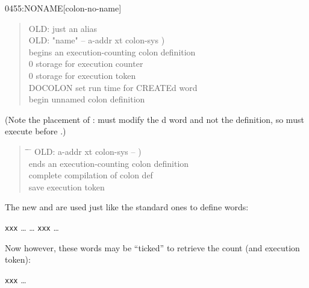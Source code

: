 \begin{worddef}{0455}{:NONAME}[colon-no-name]
\begin{defer}
\begin{quote}
\begin{tabbing}
			\word{:} OLD: \word{:} \word{;}								\>\>\>  just an alias \\[1.5\parskip]

			OLD: \word{:}  "name" -- a-addr xt colon-sys ) \\
			\+  begins an execution-counting colon definition \\
				  0 \word{,}					\>\>  storage for execution counter \\
				0 \word{,}												\>\>  storage for execution token \\
				DOCOLON													\>\>  set run time for CREATEd word \\
			\-												\>\>  begin unnamed colon definition \\
			\word{;}
		  \end{tabbing}
		\end{quote}

		(Note the placement of :  must modify
		the d word and not the  definition,
		so  must execute before .)

		\begin{quote}\ttfamily
		  \begin{tabbing}
			\tab \= \tab \= \hspace*{12em} \= \kill
			OLD: \word{;}  a-addr xt colon-sys -- ) \\
			\+  ends an execution-counting colon definition \\
				 \word{;}										\>\>  complete compilation of colon def \\
			\-	  \word{!}								\>\>  save execution token \\
			\word{;} 
		  \end{tabbing}
		\end{quote}

		The new \word{:} and \word{;} are used just like the standard
		ones to define words:

		\tab {\ldots} \word{:} \texttt{xxx} {\ldots} \word{;}
			{\ldots} \texttt{xxx} {\ldots}

		Now however, these words may be ``ticked'' to retrieve the
		count (and execution token):

		\tab {\ldots}  \texttt{xxx}   {\ldots}
	\end{defer}
\end{worddef}


